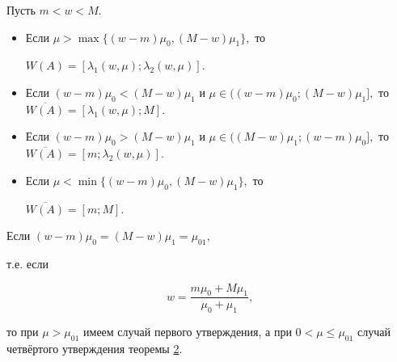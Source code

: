 \begin{theorem}[2]Пусть $m < w < M.$

\begin{itemize}

\item[ {\rm 1.}] Если $\mu > \max {\{(w-m) \mu_{0}, (M-w) \mu_1\}},$ то

$W(A)=[\lambda_1(w, \mu); \lambda_2(w, \mu)].$

\item[{\rm 2.}] Если $(w-m) \mu_{0} < (M-w) \mu_1$ и $\mu\in((w-m)

\mu_{0}; (M-w) \mu_1],$ то \\ $\overline{W(A)}=[\lambda_1(w, \mu); M].$

\item[{\rm 3.}] Если $(w-m) \mu_{0} > (M-w) \mu_1$ и $\mu \in ((M-w)

\mu_1 ; (w-m) \mu_{0}],$  то \\ $\overline{W(A)}=[m ; \lambda_2(w,

\mu)].$

\item[{\rm 4.}] Если $\mu < \min {\{(w-m) \mu_{0}, (M-w) \mu_1\}},$ то

$\overline{W(A)}=[m; M].$



\end{itemize}



\end{theorem}



\smallskip



\begin{remark}[2] Если $(w-m) \mu_{0} = (M-w) \mu_1 = \mu_{01}$,

т.е. если

$$

w=\frac{m \mu_{0}+M \mu_1}{\mu_0+\mu_1},

$$

то при $\mu> \mu_{01}$ имеем случай первого утверждения, а при $0<

\mu\leq\mu_{01}$ случай четвёртого утверждения теоремы \hyperlink{RD:th2}{2}.

\end{remark}





\smallskip



\hypertarget{RD:th3}{}



